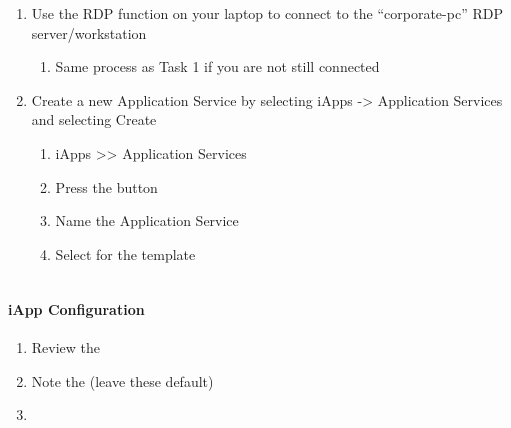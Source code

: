 \documentclass[letterpaper,10pt,english]{sphinxmanual}
\begin{document}
\begin{enumerate}
\item {} 
Use the RDP function on your laptop to connect to the “corporate-pc”
RDP server/workstation
\begin{enumerate}
\item {} 
Same process as Task 1 if you are not still connected

\end{enumerate}

\item {} 
Create a new Application Service by selecting iApps -\textgreater{} Application
Services and selecting Create
\begin{enumerate}
\item {} 
iApps \textgreater{}\textgreater{} Application Services

\item {} 
Press the  button

\item {} 
Name the Application Service 

\item {} 
Select  for the template

\end{enumerate}

\end{enumerate}


\begin{savenotes}\sphinxattablestart
\centering
\begin{tabulary}{\linewidth}[t]{|T|}
\hline
\\
\hline
\end{tabulary}
\par
\sphinxattableend\end{savenotes}


\paragraph{iApp Configuration}
\label{\detokenize{class2/module1/lab1:iapp-configuration}}\begin{enumerate}
\item {} 
Review the 

\item {} 
Note the  (leave these default)

\item {} 

\end{enumerate}
\end{document}

